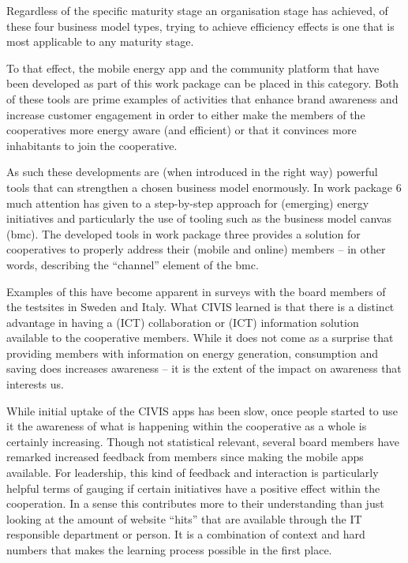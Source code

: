 Regardless of the specific maturity stage an organisation stage has achieved, of these four business model types, trying to achieve efficiency effects is one that is most applicable to any maturity stage. 

To that effect, the mobile energy app and the community platform that have been developed as part of this work package can be placed in this category. Both of these tools are prime examples of activities that enhance brand awareness and increase customer engagement in order to either make the members of the cooperatives more energy aware (and efficient) or that it convinces more inhabitants to join the cooperative.

As such these developments are (when introduced in the right way) powerful tools that can strengthen a chosen business model enormously. In work package 6 much attention has given to a step-by-step approach for (emerging) energy initiatives and particularly the use of tooling such as the business model canvas (bmc). The developed tools in work package three provides a solution for cooperatives to properly address their (mobile and online) members -- in other words, describing the ``channel'' element of the bmc.

Examples of this have become apparent in surveys with the board members of the testsites in Sweden and Italy. What CIVIS learned is that there is a distinct advantage in having a (ICT) collaboration or (ICT) information solution available to the cooperative members. While it does not come as a surprise that providing members with information on energy generation, consumption and saving does increases awareness -- it is the extent of the impact on awareness that interests us.

While initial uptake of the CIVIS apps has been slow, once people started to use it the awareness of what is happening within the cooperative as a whole is certainly increasing. Though not statistical relevant, several board members have remarked increased feedback from members since making the mobile apps available. For leadership, this kind of feedback and interaction is particularly helpful terms of gauging if certain initiatives have a positive effect within the cooperation. In a sense this contributes more to their understanding than just looking at the amount of website ``hits'' that are available through the IT responsible department or person. It is a combination of context and hard numbers that makes the learning process possible in the first place. 
